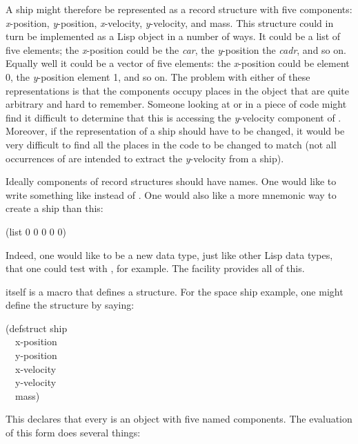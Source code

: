A ship might therefore be represented as a record structure with five
components: \emph{x}-position, \emph{y}-position, \emph{x}-velocity, \emph{y}-velocity, and mass.
This structure could in turn be implemented as a Lisp object in a
number of ways.  It could be a list of five elements; the \emph{x}-position
could be the \emph{car}, the \emph{y}-position the \emph{cadr}, and so on.  Equally
well it could be a vector of five elements: the \emph{x}-position could be
element 0, the \emph{y}-position element 1, and so on.  The problem with either
of these representations is that the components occupy places in the
object that are quite arbitrary and hard to remember.  Someone looking at
 or  in a piece of code might
find it difficult to determine that this is accessing the \emph{y}-velocity
component of .  Moreover, if the representation of a ship should
have to be changed, it would be very difficult to find all the places
in the code to be changed to match (not all occurrences of 
are intended to extract the \emph{y}-velocity from a ship).

Ideally components of record structures should have names.  One would
like to write something like
 instead of .
One would also like a more mnemonic way to create a ship than this:
\begin{lisp}
(list 0 0 0 0 0)
\end{lisp}
Indeed, one would like  to be a new data type, just like other
Lisp data types, that one could test with , for example.
The  facility provides all of this.

 itself is a macro that defines a structure.  For the
space ship example, one might define the structure by saying:
\begin{lisp}
(defstruct ship \\
~~x-position \\
~~y-position \\
~~x-velocity \\
~~y-velocity \\
~~mass)
\end{lisp}
This declares that every  is an object with five named components.
The evaluation of this form does several things:

